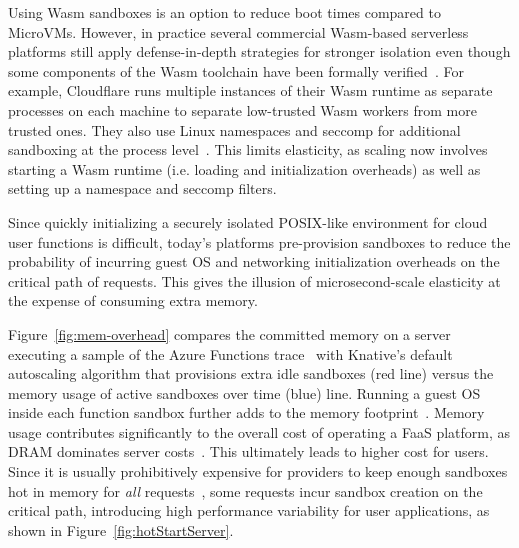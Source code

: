 Using Wasm sandboxes is an option to reduce boot times compared to MicroVMs. However, in practice several commercial Wasm-based serverless platforms still apply defense-in-depth strategies for stronger isolation even though some components of the Wasm toolchain have been  formally verified~\cite{veriwasm, Johnson:WaVe:2023, rwasm}. For example, Cloudflare runs multiple instances of their Wasm runtime as separate processes on each machine to separate low-trusted Wasm workers from more trusted ones. They also use Linux namespaces and seccomp for additional sandboxing at the process level~\cite{cloudflare-workers-security}. This limits elasticity, as scaling now involves starting a Wasm runtime (i.e. loading and initialization overheads) as well as setting up a namespace and seccomp filters.

Since quickly initializing a securely isolated POSIX-like environment for cloud user functions is difficult, today's platforms pre-provision sandboxes to reduce the probability of incurring guest OS and networking initialization overheads on the critical path of requests. This gives the illusion of microsecond-scale elasticity at the  expense of consuming extra memory.

Figure~\ref{fig:mem-overhead} compares the committed memory on a server executing a sample of the Azure Functions trace~\cite{serverless-in-the-wild} with Knative's default autoscaling algorithm that provisions extra idle sandboxes (red line) versus the memory usage of active sandboxes over time (blue) line. Running a guest OS inside each function sandbox further adds to the memory footprint~\cite{medes, runD}. Memory usage contributes significantly to the overall cost of operating a FaaS platform, as DRAM dominates server costs~\cite{pond-dram-cost, tmo-dram-cost}. This ultimately leads to higher cost for users.
Since it is usually prohibitively expensive for providers to keep enough sandboxes hot in memory for \textit{all} requests~\cite{firecracker, serverless-in-the-wild, faascache, knative}, some requests incur sandbox creation on the critical path, introducing high performance variability for user applications, as shown in Figure~\ref{fig:hotStartServer}.
